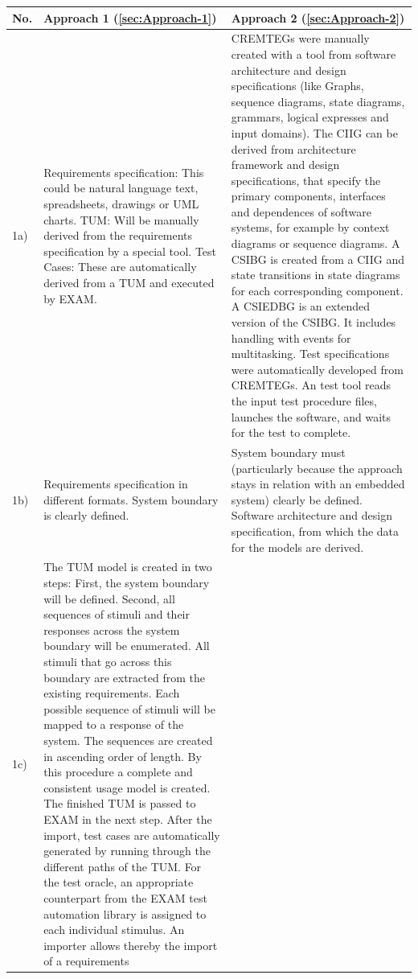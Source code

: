 \begin{small} 		
	\begin{longtable}[h]{p{0.45cm}|p{}|p{}}
\hline 
\textbf{No.} & \textbf {Approach 1 (\autoref{sec:Approach-1})}  & \textbf{Approach 2 (\autoref{sec:Approach-2})}\\
\hline 
1a)  & Requirements specification: This could be natural language text, spreadsheets,
drawings or UML charts. TUM: Will be manually derived from the requirements
specification by a special tool. Test Cases: These are automatically
derived from a TUM and executed by EXAM.  & CREMTEGs were manually created with a tool from software architecture
and design specifications (like Graphs, sequence diagrams, state diagrams,
grammars, logical expresses and input domains). The CIIG can be derived
from architecture framework and design specifications, that specify
the primary components, interfaces and dependences of software systems,
for example by context diagrams or sequence diagrams. A CSIBG is created
from a CIIG and state transitions in state diagrams for each corresponding
component. A CSIEDBG is an extended version of the CSIBG. It includes
handling with events for multitasking. Test specifications were automatically
developed from CREMTEGs. An test tool reads the input test procedure
files, launches the software, and waits for the test to complete.\\
\hline 
1b) & Requirements specification in different formats. System boundary is
clearly defined.  & System boundary must (particularly because the approach stays in relation
with an embedded system) clearly be defined. Software architecture
and design specification, from which the data for the models are derived.\\
\hline 
1c)  & The TUM model is created in two steps: First, the system boundary
will be defined. Second, all sequences of stimuli and their responses
across the system boundary will be enumerated. All stimuli that go
across this boundary are extracted from the existing requirements.
Each possible sequence of stimuli will be mapped to a response of
the system. The sequences are created in ascending order of length.
By this procedure a complete and consistent usage model is created.
The finished TUM is passed to EXAM in the next step. After the import,
test cases are automatically generated by running through the different
paths of the TUM. For the test oracle, an appropriate counterpart
from the EXAM test automation library is assigned to each individual
stimulus. An importer allows thereby the import of a requirements

\end{longtable}
\end{small}
